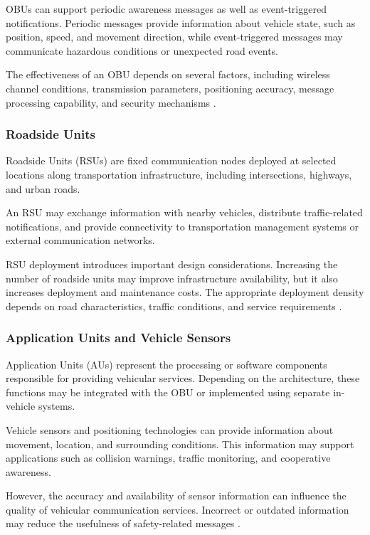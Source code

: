 OBUs can support periodic awareness
messages as well as event-triggered
notifications. Periodic messages provide
information about vehicle state, such
as position, speed, and movement
direction, while event-triggered
messages may communicate hazardous
conditions or unexpected road events.

The effectiveness of an OBU depends
on several factors, including wireless
channel conditions, transmission
parameters, positioning accuracy,
message processing capability,
and security mechanisms
\cite{Zeadally2012}.

\subsubsection{Roadside Units}

Roadside Units (RSUs) are fixed
communication nodes deployed at
selected locations along transportation
infrastructure, including intersections,
highways, and urban roads.

An RSU may exchange information
with nearby vehicles, distribute
traffic-related notifications,
and provide connectivity to
transportation management systems
or external communication networks.

RSU deployment introduces important
design considerations. Increasing
the number of roadside units may
improve infrastructure availability,
but it also increases deployment
and maintenance costs. The appropriate
deployment density depends on
road characteristics, traffic
conditions, and service requirements
\cite{Karagiannis2011}.

\subsubsection{Application Units and Vehicle Sensors}

Application Units (AUs) represent
the processing or software components
responsible for providing vehicular
services. Depending on the architecture,
these functions may be integrated
with the OBU or implemented using
separate in-vehicle systems.

Vehicle sensors and positioning
technologies can provide information
about movement, location, and
surrounding conditions. This
information may support applications
such as collision warnings,
traffic monitoring, and
cooperative awareness.

However, the accuracy and
availability of sensor information
can influence the quality of
vehicular communication services.
Incorrect or outdated information
may reduce the usefulness of
safety-related messages
\cite{Zeadally2012}.

